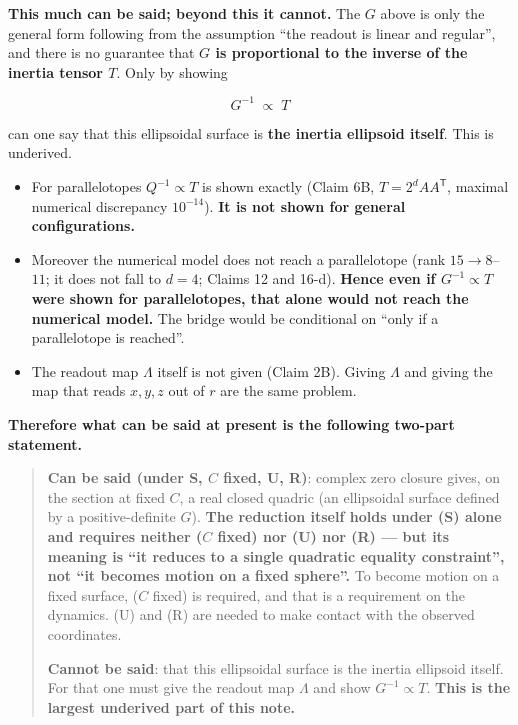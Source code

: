 \documentclass[
  10pt,
]{article}
\providecommand{\tightlist}{%
  \setlength{\itemsep}{0pt}\setlength{\parskip}{0pt}}
\begin{document}
\textbf{This much can be said; beyond this it cannot.} The \(G\) above
is only the general form following from the assumption ``the readout is
linear and regular'', and there is no guarantee that \textbf{\(G\) is
proportional to the inverse of the inertia tensor \(T\)}. Only by
showing

\[G^{-1} \;\propto\; T\]

can one say that this ellipsoidal surface is \textbf{the inertia
ellipsoid itself}. This is underived.

\begin{itemize}
\tightlist
\item
  For parallelotopes \(Q^{-1} \propto T\) is shown exactly (Claim 6B,
  \(T = 2^d AA^{\mathsf T}\), maximal numerical discrepancy
  \(10^{-14}\)). \textbf{It is not shown for general configurations.}
\item
  Moreover the numerical model does not reach a parallelotope (rank
  \(15 \to 8\)--\(11\); it does not fall to \(d=4\); Claims 12 and
  16-d). \textbf{Hence even if \(G^{-1}\propto T\) were shown for
  parallelotopes, that alone would not reach the numerical model.} The
  bridge would be conditional on ``only if a parallelotope is reached''.
\item
  The readout map \(\Lambda\) itself is not given (Claim 2B). Giving
  \(\Lambda\) and giving the map that reads \(x,y,z\) out of \(r\) are
  the same problem.
\end{itemize}

\textbf{Therefore what can be said at present is the following two-part
statement.}

\begin{quote}
\textbf{Can be said (under S, \(C\) fixed, U, R)}: complex zero closure
gives, on the section at fixed \(C\), a real closed quadric (an
ellipsoidal surface defined by a positive-definite \(G\)). \textbf{The
reduction itself holds under (S) alone and requires neither (\(C\)
fixed) nor (U) nor (R) --- but its meaning is ``it reduces to a single
quadratic equality constraint'', not ``it becomes motion on a fixed
sphere''.} To become motion on a fixed surface, (\(C\) fixed) is
required, and that is a requirement on the dynamics. (U) and (R) are
needed to make contact with the observed coordinates.

\textbf{Cannot be said}: that this ellipsoidal surface is the inertia
ellipsoid itself. For that one must give the readout map \(\Lambda\) and
show \(G^{-1}\propto T\). \textbf{This is the largest underived part of
this note.}
\end{quote}
\end{document}
